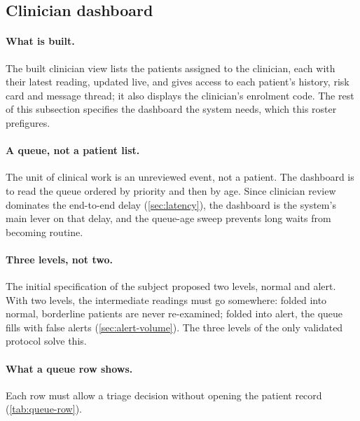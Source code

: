 \subsection{Clinician dashboard}\label{sec:dashboard}\label{sec:queue-view}\label{sec:three-tiers}\label{sec:queue-row}\label{sec:never-display}\label{sec:verdict-capture}\label{sec:dash-roles}\label{sec:replace-task}

\paragraph{What is built.} The built clinician view lists the patients assigned to the clinician, each with their latest reading, updated live, and gives access to each patient's history, risk card and message thread; it also displays the clinician's enrolment code. The rest of this subsection specifies the dashboard the system needs, which this roster prefigures.

\paragraph{A queue, not a patient list.} The unit of clinical work is an unreviewed event, not a patient. The dashboard is to read the queue ordered by priority and then by age. Since clinician review dominates the end-to-end delay (\cref{sec:latency}), the dashboard is the system's main lever on that delay, and the queue-age sweep prevents long waits from becoming routine.

\paragraph{Three levels, not two.} The initial specification of the subject proposed two levels, normal and alert. With two levels, the intermediate readings must go somewhere: folded into normal, borderline patients are never re-examined; folded into alert, the queue fills with false alerts (\cref{sec:alert-volume}). The three levels of the only validated protocol solve this.

\paragraph{What a queue row shows.} Each row must allow a triage decision without opening the patient record (\cref{tab:queue-row}).

